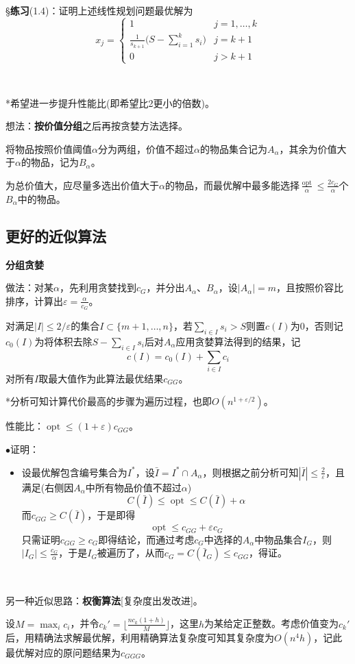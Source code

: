 \documentclass[a4paper,UTF8,fontset=windows]{ctexart}
\newcommand{\exce}[2]{\S\textbf{练习}(#1)：{\kaishu #2}}
\newcommand{\proo}[1]{{\kaishu $\bullet$证明：
\begin{itemize}
    \item[] #1
\end{itemize}
}}
\DeclareMathOperator*{\opt}{opt}
\begin{document}
\exce{1.4}{证明上述线性规划问题最优解为
$$x_j=\begin{cases}1&j=1,\dots,k\\\frac{1}{s_{k+1}}\big(S-\sum_{i=1}^ks_i\big)&j=k+1\\0&j>k+1\end{cases}$$
}

\

*希望进一步提升性能比(即希望比2更小的倍数)。

想法：\textbf{按价值分组}之后再按贪婪方法选择。

将物品按照价值阈值$\alpha$分为两组，价值不超过$\alpha$的物品集合记为$A_\alpha$，其余为价值大于$\alpha$的物品，记为$B_\alpha$。

为总价值大，应尽量多选出价值大于$\alpha$的物品，而最优解中最多能选择$\frac{\opt}{\alpha}\le\frac{2c_G}{\alpha}$个$B_\alpha$中的物品。

\subsection{更好的近似算法}

\textbf{分组贪婪}

做法：对某$\alpha$，先利用贪婪找到$c_G$，并分出$A_\alpha$、$B_\alpha$，设$|A_\alpha|=m$，且按照价容比排序，计算出$\varepsilon=\frac{\alpha}{c_G}$。

对满足$|I|\le2/\varepsilon$的集合$I\subset\{m+1,\dots,n\}$，若$\sum_{i\in I}s_i>S$则置$c(I)$为0，否则记$c_0(I)$为将体积去除$S-\sum_{i\in I}s_i$后对$A_\alpha$应用贪婪算法得到的结果，记
$$c(I)=c_0(I)+\sum_{i\in I}c_i$$
对所有$I$取最大值作为此算法最优结果$c_{GG}$。

*分析可知计算代价最高的步骤为遍历过程，也即$O(n^{1+\varepsilon/2})$。

性能比：$\opt\le(1+\varepsilon)c_{GG}$。

\proo{
    设最优解包含编号集合为$I^*$，设$\bar{I}=I^*\cap A_\alpha$，则根据之前分析可知$|\bar{I}|\le\frac{2}{\varepsilon}$，且满足(右侧因$A_\alpha$中所有物品价值不超过$\alpha$)
    $$C(\bar{I})\le\opt\le C(\bar{I})+\alpha$$
    而$c_{GG}\ge C(\bar{I})$，于是即得
    $$\opt\le c_{GG}+\varepsilon c_G$$
    只需证明$c_{GG}\ge c_G$即得结论，而通过考虑$c_G$中选择的$A_\alpha$中物品集合$I_G$，则$|I_G|\le\frac{c_G}{\alpha}$，于是$I_G$被遍历了，从而$c_G=C(\bar{I}_G)\le c_{GG}$，得证。
}

\

另一种近似思路：\textbf{权衡算法}[复杂度出发改进]。

设$M=\max_ic_i$，并令$c_k'=\lfloor\frac{nc_k(1+h)}{M}\rfloor$，这里$h$为某给定正整数。考虑价值变为$c_k'$后，用精确法求解最优解，利用精确算法复杂度可知其复杂度为$O(n^4h)$，记此最优解对应的原问题结果为$c_{GGG}$。
\end{document}
